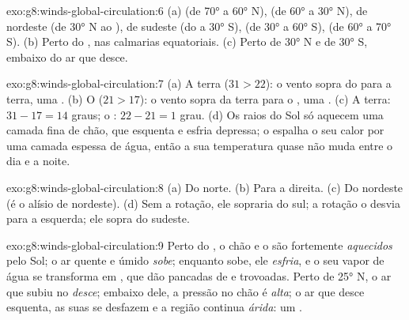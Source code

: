 \begin{solution}{exo:g8:winds-global-circulation:6}
(a)  (de \ang{70} a \ang{60} N), 
(de \ang{60} a \ang{30} N),  de nordeste (de \ang{30} N ao
),  de sudeste (do  a \ang{30} S), 
(de \ang{30} a \ang{60} S),  (de \ang{60} a
\ang{70} S). (b) Perto do , nas calmarias equatoriais. (c) Perto de
\ang{30} N e de \ang{30} S, embaixo do ar que desce.
\end{solution}

\begin{solution}{exo:g8:winds-global-circulation:7}
(a) A terra ($31 > 22$): o vento sopra do  para a terra, uma . (b) O  ($21 > 17$): o vento sopra da terra para o , uma
. (c) A terra: $31 - 17 = 14$ graus; o : $22 -
21 = 1$ grau. (d) Os raios do Sol só aquecem uma camada fina de chão, que
esquenta e esfria depressa; o  espalha o seu calor por uma camada
espessa de água, então a sua temperatura quase não muda entre o dia e a
noite.
\end{solution}

\begin{solution}{exo:g8:winds-global-circulation:8}
(a) Do norte. (b) Para a direita. (c) Do nordeste (é o alísio de
nordeste). (d) Sem a rotação, ele sopraria do sul; a rotação o desvia
para a esquerda; ele sopra do sudeste.
\end{solution}

\begin{solution}{exo:g8:winds-global-circulation:9}
Perto do , o chão e o  são fortemente \emph{aquecidos} pelo
Sol; o ar quente e úmido \emph{sobe}; enquanto sobe, ele \emph{esfria}, e
o seu vapor de água se transforma em \emph{}, que dão pancadas de
 e trovoadas. Perto de \ang{25} N, o ar que subiu no 
\emph{desce}; embaixo dele, a pressão no chão é \emph{alta}; o ar que
desce esquenta, as suas  se desfazem e a região continua
\emph{árida}: um .
\end{solution}

